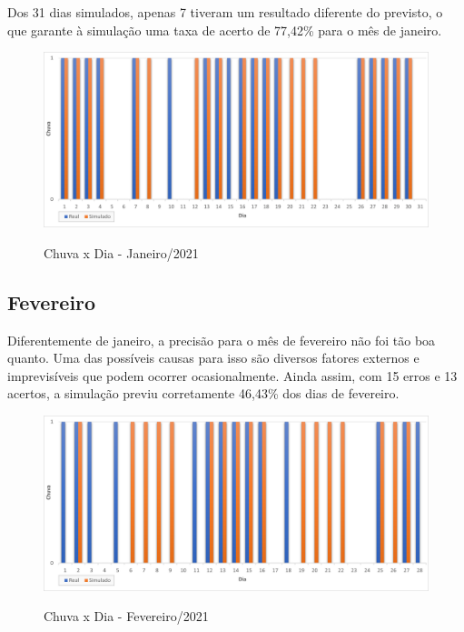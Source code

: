 Dos 31 dias simulados, apenas 7 tiveram um resultado diferente do previsto, o que garante à simulação uma taxa de acerto de 77,42\% para o mês de janeiro.
\begin{figure}[H]
	\caption{\small Chuva x Dia - Janeiro/2021}
	\centering
	\includegraphics[width=\textwidth]{figs/jan.png}
	\label{f.rjan}
\end{figure}

\subsection{Fevereiro}
Diferentemente de janeiro, a precisão para o mês de fevereiro não foi tão boa quanto. Uma das possíveis causas para isso são diversos fatores externos e imprevisíveis que podem ocorrer ocasionalmente. Ainda assim, com 15 erros e 13 acertos, a simulação previu corretamente 46,43\% dos dias de fevereiro.
\begin{figure}[H]
	\caption{\small Chuva x Dia - Fevereiro/2021}
	\centering
	\includegraphics[width=\textwidth]{figs/fev.png}
	\label{f.rfev}
\end{figure}


